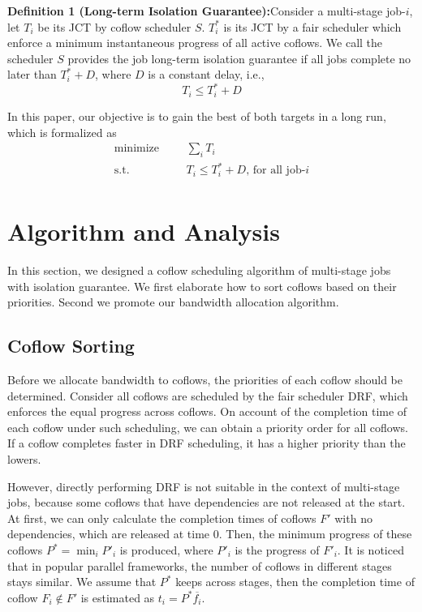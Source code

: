 \documentclass[10pt, conference, letterpaper]{IEEEtran}
\begin{document}
\textbf{Definition 1 (Long-term Isolation Guarantee):}Consider a multi-stage job-$i$, let $T_i$ be its JCT by coflow scheduler $S$. $T_i^*$ is its JCT by a fair scheduler which enforce a minimum instantaneous progress of all active coflows. We call the scheduler $S$ provides the job long-term isolation guarantee if all jobs complete no later than $T_i^* + D$, where $D$ is a constant delay, i.e.,
\begin{equation}
	T_i \leq T_i^* + D
\end{equation}

In this paper, our objective is to gain the best of both targets in a long run, which is formalized as
\begin{equation}
	\begin{aligned}
		\text{minimize} & & &\sum\limits_{i}T_i\\
		\text{s.t.} & & &T_i \leq T_i^* + D \text{, for all job-}i\\
	\end{aligned}
\end{equation}

\section{Algorithm and Analysis}
In this section, we designed a coflow scheduling algorithm of multi-stage jobs with isolation guarantee. We first elaborate how to sort coflows based on their priorities. Second we promote our bandwidth allocation algorithm.

\subsection{Coflow Sorting}
Before we allocate bandwidth to coflows, the priorities of each coflow should be determined. Consider all coflows are scheduled by the fair scheduler DRF, which enforces the equal progress across coflows\cite{DRF,HUG}. On account of the completion time of each coflow under such scheduling, we can obtain a priority order for all coflows. If a coflow completes faster in DRF scheduling, it has a higher priority than the lowers.

However, directly performing DRF is not suitable in the context of multi-stage jobs, because some coflows that have dependencies are not released at the start. At first, we can only calculate the completion times of coflows $F'$ with no dependencies, which are released at time 0. Then, the minimum progress of these coflows $P^* = \min_iP'_i$ is produced, where $P'_i$ is the progress of $F'_i$. It is noticed that in popular parallel frameworks, the number of coflows in different stages stays similar\cite{Spark,coflowsurvey}. We assume that $P^*$ keeps across stages, then the completion time of coflow $F_i \notin F'$ is estimated as $t_i = P^*\overline{f_i}$.
\end{document}
